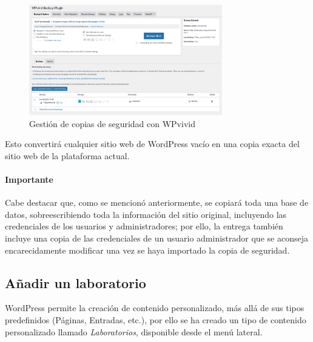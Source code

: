                 \begin{figure}
                    \centering

                    \includegraphics[width=0.75\textwidth]{images/Capturas/localhost/wpvivid.png}
                    \caption{Gestión de copias de seguridad con WPvivid}
                    \label{fig:wpvivid}
                \end{figure}

                Esto convertirá cualquier sitio web de WordPress vacío en una copia exacta del sitio web de la plataforma actual.
                
                \paragraph{Importante}
                
                    Cabe destacar que, como se mencionó anteriormente, se copiará toda una base de datos, sobreescribiendo toda la información del sitio original, incluyendo las credenciales de los usuarios y administradores; por ello, la entrega también incluye una copia de las credenciales de un usuario administrador que se aconseja encarecidamente modificar una vez se haya importado la copia de seguridad.

        \subsection{Añadir un laboratorio}

            WordPress permite la creación de contenido personalizado, más allá de sus tipos predefinidos (Páginas, Entradas, etc.), por ello se ha creado un tipo de contenido personalizado llamado \textit{Laboratorios}, disponible desde el menú lateral.


